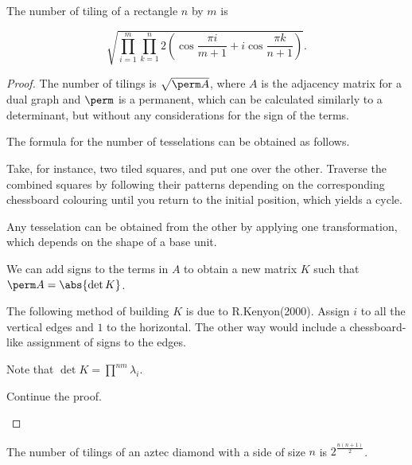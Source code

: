 \documentclass[11pt]{scrartcl}
\begin{document}
  \begin{theorem}
    The number of tiling of a rectangle $n$ by $m$ is
    
    \begin{equation*}
      \sqrt{\prod_{i=1}^{m}\prod_{k=1}^{n}2(\cos \frac{\pi i}{m+1} + i
        \cos \frac{\pi k}{n+1})}.
    \end{equation*}
  \end{theorem}
  \begin{proof}
    \hfill The number of tilings is $\sqrt{\perm A}$, where $A$ is the
    adjacency matrix for a dual graph and $\perm$ is a permanent,
    which can be calculated similarly to a determinant, but without
    any considerations for the sign of the terms.

    The formula for the number of tesselations can be obtained as
    follows.

    Take, for instance, two tiled squares, and put one over the other.
    Traverse the combined squares by following their patterns
    depending on the corresponding chessboard colouring until you
    return to the initial position, which yields a cycle.

    \begin{lemma}
      Any tesselation can be obtained from the other by applying one
      transformation, which depends on the shape of a base unit.
    \end{lemma}


    We can add signs to the terms in $A$ to obtain a new matrix $K$
    such that $\perm A = \abs{\det K}$.

    The following method of building $K$ is due to R.Kenyon(2000).
    Assign $i$ to all the vertical edges and $1$ to the horizontal.
    The other way would include a chessboard-like assignment of signs
    to the edges.

    Note that $\det K = \prod^{nm}\lambda_{i}$.


    \begin{exercise}

      Continue the proof.

    \end{exercise}
    
  \end{proof}
  \begin{theorem}[Kuperberg et al]
    The number of tilings of an aztec diamond with a side of size $n$
    is $2^{\frac{n(n+1)}{2}}$.
  \end{theorem}
\end{document}
